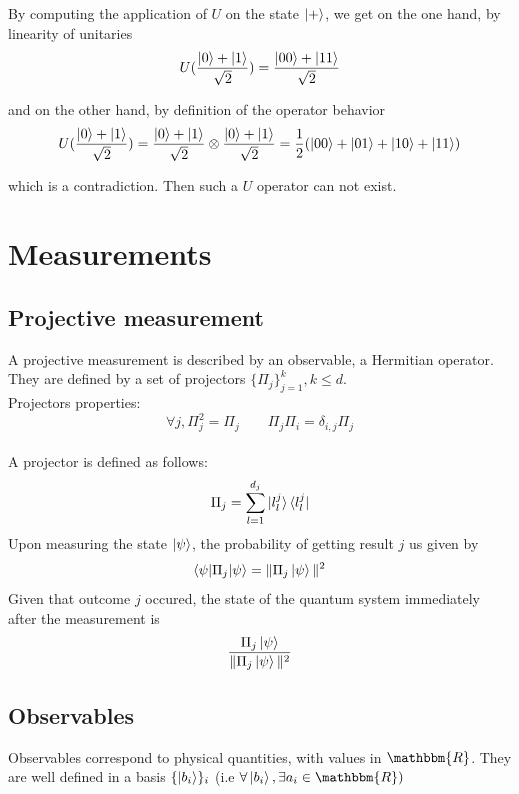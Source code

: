 \documentclass{article}
\begin{document}
By computing the application of $U$ on the state $\ket{+}$, we get on the one hand, by linearity of unitaries
\begin{equation}
    U(\frac{\ket{0}+\ket{1}}{\sqrt{2}}) = \frac{\ket{00}+\ket{11}}{\sqrt{2}}
\end{equation}

and on the other hand, by definition of the operator behavior
\begin{equation}
    U(\frac{\ket{0}+\ket{1}}{\sqrt{2}}) = \frac{\ket{0}+\ket{1}}{\sqrt{2}} \otimes \frac{\ket{0}+\ket{1}}{\sqrt{2}}
    =\frac{1}{2}(\ket{00}+\ket{01}+\ket{10}+\ket{11})
\end{equation}

which is a contradiction. Then such a $U$ operator can not exist.
\section{Measurements}
\subsection{Projective measurement}
A projective measurement is described by an observable, a Hermitian operator. They are defined by a set of projectors $\{\Pi_j\}_{j=1}^k, k \leq d$.\\
Projectors properties:
\begin{equation}
    \forall j, \Pi_j^2 = \Pi_j \qquad \Pi_j\Pi_i = \delta_{i,j}\Pi_j
\end{equation}
\\\noindent
A projector is defined as follows:
\begin{equation}
    \Pi_j = \sum_{l=1}^{d_j}\ket{l_l^j}\bra{l_l^j}
\end{equation}
Upon measuring the state $\ket{\psi}$, the probability of getting result $j$ us given by
\begin{equation}
    \braket{\psi|\Pi_j|\psi} = \| \Pi_j\ket{\psi}\|^2
\end{equation}
Given that outcome $j$ occured, the state of the quantum system immediately after the measurement is
\begin{equation}
    \frac{\Pi_j\ket{\psi}}{\| \Pi_j\ket{\psi}\|^2}
\end{equation}

\subsection{Observables}
Observables correspond to physical quantities, with values in $\mathbbm{R}$.
They are well defined in a basis $\{\ket{b_i}\}_i$ (i.e $\forall \ket{b_i}, \exists a_i \in \mathbbm{R})$
\end{document}
